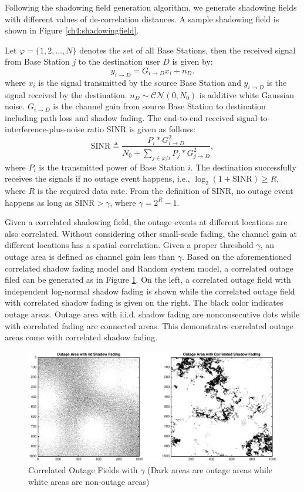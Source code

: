 Following the shadowing field generation algorithm, we generate shadowing fields with different values of de-correlation distances. A sample shadowing field is shown in Figure \ref{ch4:shadowingfield}.
\par Let $\varphi = \{1, 2, \dots, N\}$ denotes the set of all Base Stations, then the received signal from Base Station $j$ to the destination user $D$ is given by:
\begin{equation}
y_{i\to D} = G_{i\to D}x_{i}+n_{D}.
\end{equation}
where $x_{i}$ is the signal transmitted by the source Base Station and $y_{i\to D}$ is the signal received by the destination. $n_{D}\sim \mathcal{CN}(0,N_{0})$ is additive white Gaussian noise. $G_{i\to D}$ is the channel gain from source Base Station to destination including path loss and shadow fading. The end-to-end received signal-to-interference-plus-noise ratio $\text{SINR}$ is given as follows:
\begin{equation}
\text{SINR} \triangleq \frac{P_{i}*G_{i\to D}^{2}}{N_{0}+\sum_{j\in \varphi/i}P_{j}*G_{j\to D}^2},
\end{equation}
where $P_{i}$ is the transmitted power of Base Station $i$. The destination successfully receives the signals if no outage event happens, i.e., $\log_{2}(1+\text{SINR})\ge R$, where $R$ is the required data rate. From the definition of SINR, no outage event happens as long as $\text{SINR} > \gamma$, where $\gamma = 2^{R}-1$.
\par Given a correlated shadowing field, the outage events at different locations are also correlated. Without considering other small-scale fading, the channel gain at different locations has a spatial correlation. Given a proper threshold $\gamma$, an outage area is defined as channel gain less than $\gamma$. Based on the aforementioned correlated shadow fading model and Random system model, a correlated outage filed can be generated as in Figure \ref{outagefie}. On the left, a correlated outage field with independent log-normal shadow fading is shown while the correlated outage field with correlated shadow fading is given on the right. The black color indicates outage areas. Outage area with i.i.d. shadow fading are nonconsecutive dots while with correlated fading are connected areas. This demonstrates correlated outage areas come with correlated shadow fading.

\begin{figure}
\centering
\includegraphics[width=14cm]{outageArea.eps}
\caption{Correlated Outage Fields with $\gamma$ (Dark areas are outage areas while white areas are non-outage areas)}
\label{outagefie}
\end{figure}

